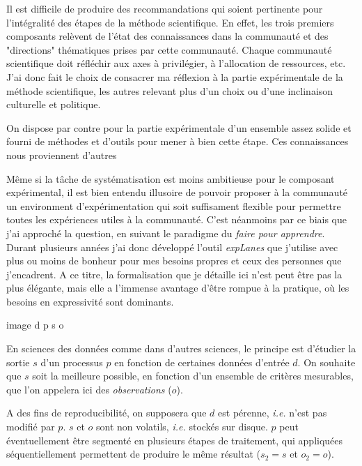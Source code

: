 Il est difficile de produire des recommandations qui soient pertinente pour l'intégralité des étapes de la méthode scientifique. En effet, les trois premiers composants relèvent de l'état des connaissances dans la communauté et des "directions" thématiques prises par cette communauté. Chaque communauté scientifique doit réfléchir aux axes à privilégier, à l'allocation de ressources, etc. J'ai donc fait le choix de consacrer ma réflexion à la partie expérimentale de la méthode scientifique, les autres relevant plus d'un choix ou d'une inclinaison culturelle et politique.

On dispose par contre pour la partie expérimentale d'un ensemble assez solide et fourni de méthodes et d'outils pour mener à bien cette étape. Ces connaissances nous proviennent d'autres

Même si la tâche de systématisation est moins ambitieuse pour le composant expérimental, il est bien entendu illusoire de pouvoir proposer à la communauté un environment d'expérimentation qui soit suffisament flexible pour permettre toutes les expériences utiles à la communauté. C'est néanmoins par ce biais que j'ai approché la question, en suivant le paradigme du \textsl{faire pour apprendre}. Durant plusieurs années j'ai donc développé l'outil \textsl{expLanes}\cite{explanes} que j'utilise avec plus ou moins de bonheur pour mes besoins propres et ceux des personnes que j'encadrent. A ce titre, la formalisation que je détaille ici n'est peut être pas la plus élégante, mais elle a l'immense avantage d'être rompue à la pratique, où les besoins en expressivité sont dominants.

image d p s
        o

En sciences des données comme dans d'autres sciences, le principe est d'étudier la sortie $s$ d'un processus $p$ en fonction de certaines données d'entrée $d$. On souhaite que $s$ soit la meilleure possible, en fonction d'un ensemble de critères mesurables, que l'on appelera ici des \textsl{observations} ($o$).

A des fins de reproducibilité, on supposera que $d$ est pérenne, \textit{i.e.} n'est pas modifié par $p$. $s$ et $o$ sont non volatils, \textit{i.e.} stockés sur disque. $p$ peut éventuellement être segmenté en plusieurs étapes de traitement, qui appliquées séquentiellement permettent de produire le même résultat ($s_2=s$ et $o_2=o$).

